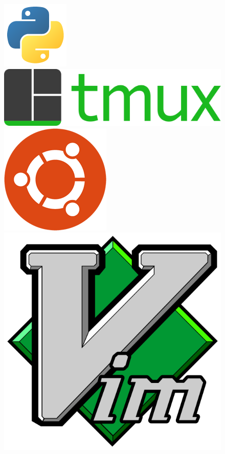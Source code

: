 \begin{figure}[ht]
  \includegraphics[height=\developmentToolsLogosHeight]{assets/tools/development/python.png}
  \includegraphics[height=\developmentToolsLogosHeight]{assets/tools/development/tmux.png}
  \includegraphics[height=\developmentToolsLogosHeight]{assets/tools/development/ubuntu.png}
  \includegraphics[height=\developmentToolsLogosHeight]{assets/tools/development/vim.png}

\end{figure}
